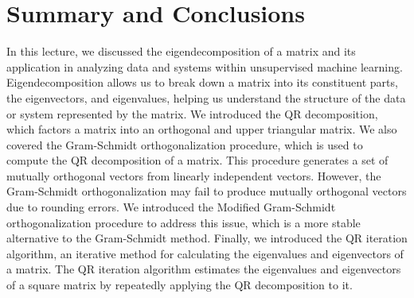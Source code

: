 \documentclass{article}[11pt]
\begin{document}
\section{Summary and Conclusions}
In this lecture, we discussed the eigendecomposition of a matrix and its application in analyzing data and systems within unsupervised machine learning. Eigendecomposition allows us to break down a matrix into its constituent parts, the eigenvectors, and eigenvalues, helping us understand the structure of the data or system represented by the matrix. We introduced the QR decomposition, which factors a matrix into an orthogonal and upper triangular matrix. We also covered the Gram-Schmidt orthogonalization procedure, which is used to compute the QR decomposition of a matrix. This procedure generates a set of mutually orthogonal vectors from linearly independent vectors. However, the Gram-Schmidt orthogonalization may fail to produce mutually orthogonal vectors due to rounding errors. We introduced the Modified Gram-Schmidt orthogonalization procedure to address this issue, which is a more stable alternative to the Gram-Schmidt method. Finally, we introduced the QR iteration algorithm, an iterative method for calculating the eigenvalues and eigenvectors of a matrix. The QR iteration algorithm estimates the eigenvalues and eigenvectors of a square matrix by repeatedly applying the QR decomposition to it.


\end{document}
